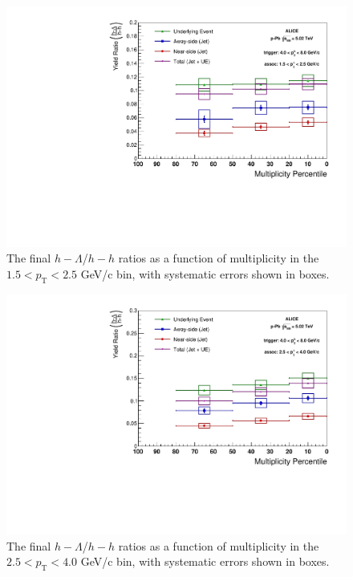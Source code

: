 \documentclass[ALICE,manyauthors]{ALICE_analysis_notes}
\begin{document}
\begin{figure}[ht]
\centering
\includegraphics[width=5in]{figures/ratio_plot_lowpt.pdf}
\caption{The final $h-\Lambda$/$h-h$ ratios as a function of multiplicity in the $1.5 < p_{\text{T}} < 2.5$ GeV/c bin, with systematic errors shown in boxes.}
\label{low_momentum_ratio}
\end{figure}

\begin{figure}[ht]
\centering
\includegraphics[width=5in]{figures/ratio_plot_highpt.pdf}
\caption{The final $h-\Lambda$/$h-h$ ratios as a function of multiplicity in the $2.5 < p_{\text{T}} < 4.0$ GeV/c bin, with systematic errors shown in boxes.}
\label{high_momentum_ratio}
\end{figure}


\clearpage
\end{document}
